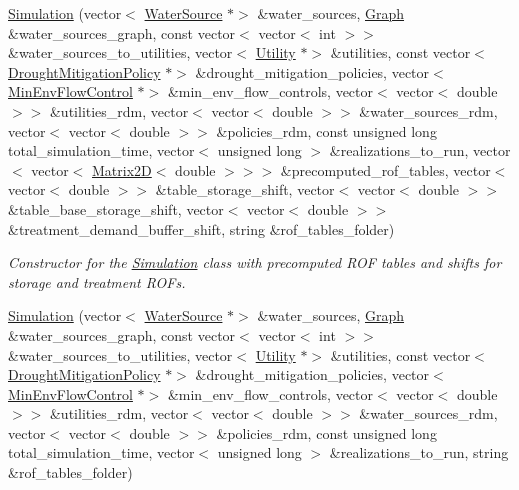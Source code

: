 \begin{DoxyCompactItemize}
\mbox{\hyperlink{classSimulation_a99c76e396f63ca8f98d362c76804345b}{Simulation}} (vector$<$ \mbox{\hyperlink{classWaterSource}{Water\+Source}} $\ast$$>$ \&water\+\_\+sources, \mbox{\hyperlink{classGraph}{Graph}} \&water\+\_\+sources\+\_\+graph, const vector$<$ vector$<$ int $>$$>$ \&water\+\_\+sources\+\_\+to\+\_\+utilities, vector$<$ \mbox{\hyperlink{classUtility}{Utility}} $\ast$$>$ \&utilities, const vector$<$ \mbox{\hyperlink{classDroughtMitigationPolicy}{Drought\+Mitigation\+Policy}} $\ast$$>$ \&drought\+\_\+mitigation\+\_\+policies, vector$<$ \mbox{\hyperlink{classMinEnvFlowControl}{Min\+Env\+Flow\+Control}} $\ast$$>$ \&min\+\_\+env\+\_\+flow\+\_\+controls, vector$<$ vector$<$ double $>$$>$ \&utilities\+\_\+rdm, vector$<$ vector$<$ double $>$$>$ \&water\+\_\+sources\+\_\+rdm, vector$<$ vector$<$ double $>$$>$ \&policies\+\_\+rdm, const unsigned long total\+\_\+simulation\+\_\+time, vector$<$ unsigned long $>$ \&realizations\+\_\+to\+\_\+run, vector$<$ vector$<$ \mbox{\hyperlink{classMatrix2D}{Matrix2D}}$<$ double $>$$>$$>$ \&precomputed\+\_\+rof\+\_\+tables, vector$<$ vector$<$ double $>$$>$ \&table\+\_\+storage\+\_\+shift, vector$<$ vector$<$ double $>$$>$ \&table\+\_\+base\+\_\+storage\+\_\+shift, vector$<$ vector$<$ double $>$$>$ \&treatment\+\_\+demand\+\_\+buffer\+\_\+shift, string \&rof\+\_\+tables\+\_\+folder)
\begin{DoxyCompactList}\small\item\em Constructor for the \mbox{\hyperlink{classSimulation}{Simulation}} class with precomputed R\+OF tables and shifts for storage and treatment R\+O\+Fs. \end{DoxyCompactList}\item 
\mbox{\hyperlink{classSimulation_a68f43435cf8308d5415cdfcdb84e1fac}{Simulation}} (vector$<$ \mbox{\hyperlink{classWaterSource}{Water\+Source}} $\ast$$>$ \&water\+\_\+sources, \mbox{\hyperlink{classGraph}{Graph}} \&water\+\_\+sources\+\_\+graph, const vector$<$ vector$<$ int $>$$>$ \&water\+\_\+sources\+\_\+to\+\_\+utilities, vector$<$ \mbox{\hyperlink{classUtility}{Utility}} $\ast$$>$ \&utilities, const vector$<$ \mbox{\hyperlink{classDroughtMitigationPolicy}{Drought\+Mitigation\+Policy}} $\ast$$>$ \&drought\+\_\+mitigation\+\_\+policies, vector$<$ \mbox{\hyperlink{classMinEnvFlowControl}{Min\+Env\+Flow\+Control}} $\ast$$>$ \&min\+\_\+env\+\_\+flow\+\_\+controls, vector$<$ vector$<$ double $>$$>$ \&utilities\+\_\+rdm, vector$<$ vector$<$ double $>$$>$ \&water\+\_\+sources\+\_\+rdm, vector$<$ vector$<$ double $>$$>$ \&policies\+\_\+rdm, const unsigned long total\+\_\+simulation\+\_\+time, vector$<$ unsigned long $>$ \&realizations\+\_\+to\+\_\+run, string \&rof\+\_\+tables\+\_\+folder)
$$
\end{DoxyCompactItemize}

